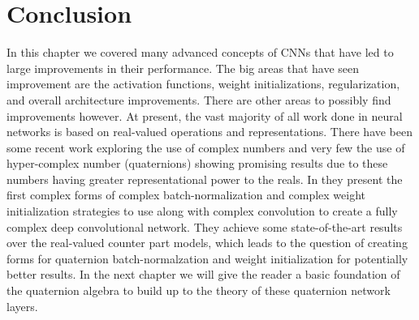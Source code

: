 \section{Conclusion}
In this chapter we covered many advanced concepts of CNNs that have led to large improvements in their performance.
The big areas that have seen improvement are the activation functions, weight initializations, regularization, and overall architecture improvements.
There are other areas to possibly find improvements however.
At present, the vast majority of all work done in neural networks is based on real-valued operations and representations.
There have been some recent work exploring the use of complex numbers and very few the use of hyper-complex number (quaternions) showing promising results due to these numbers having greater representational power to the reals.
In \cite{trabelsi2017deep} they present the first complex forms of complex batch-normalization and complex weight initialization strategies to use along with complex convolution to create a fully complex deep convolutional network.
They achieve some state-of-the-art results over the real-valued counter part models, which leads to the question of creating forms for quaternion batch-normalzation and weight initialization for potentially better results.
In the next chapter we will give the reader a basic foundation of the quaternion algebra to build up to the theory of these quaternion network layers.
